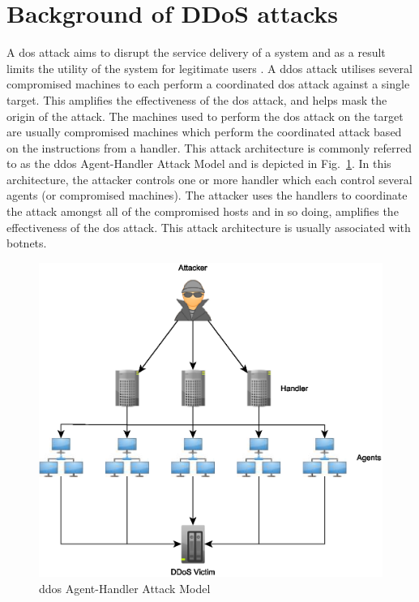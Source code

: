 \section{Background of DDoS attacks}
\label{sec2}

A \gls{dos} attack aims to disrupt the service delivery of a system and as a result limits the
utility of the system for legitimate users \cite{specht2004distributed}. A \gls{ddos} attack
utilises several compromised machines to each perform a coordinated \gls{dos} attack against a single
target. This amplifies the effectiveness of the \gls{dos} attack, and helps mask the origin of the
attack. The machines used to perform the \gls{dos} attack on the target are usually compromised
machines which perform the coordinated attack based on the instructions from a handler. This
attack architecture is commonly referred to as the \gls{ddos} Agent-Handler Attack Model and is
depicted in Fig.~\ref{fig:Chap2_DDoS_Model}. In this architecture, the attacker
controls one or more handler which each control several agents (or compromised machines). The
attacker uses the handlers to coordinate the attack amongst all of the compromised hosts and in so
doing, amplifies the effectiveness of the \gls{dos} attack. This attack architecture is usually
associated with botnets.

\begin{figure}[h]
    \centering
    \includegraphics[width=\columnwidth]{section_2/Agent_Handler_Arch.eps}
    \caption{\gls{ddos} Agent-Handler Attack Model}
    \label{fig:Chap2_DDoS_Model}
\end{figure}

